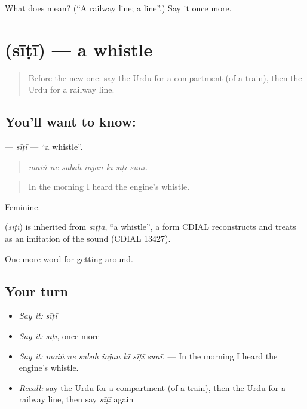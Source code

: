 \begin{tcolorbox}[breakable,colback=teal!4,colframe=teal!35!black,title={Before you move on}]
What does  mean? (\textquotedblleft{}A railway line; a line\textquotedblright{}.) Say it once more.
\end{tcolorbox}
\section[\texorpdfstring{\ur{سیٹی} (sīṭī)}{سیٹی (sīṭī)}]{ (sīṭī) — a whistle}

\label{lesson:UR-C386-siti}



\begin{quote}
Before the new one: say the Urdu for a compartment (of a train), then the Urdu for a railway line.
\end{quote}

\subsection*{You'll want to know: }
\textbf{} — \emph{sīṭī} — \textquotedblleft{}a whistle\textquotedblright{}.

\begin{quote}
      
\end{quote}

\begin{quote}
\emph{maiṅ ne subah injan kī sīṭī sunī.}
\end{quote}

\begin{quote}
In the morning I heard the engine's whistle.
\end{quote}

Feminine.

\begin{cousinweb}
\textbf{} (\emph{sīṭī}) is inherited from \emph{sīṭṭa}, \textquotedblleft{}a whistle\textquotedblright{}, a form CDIAL reconstructs and treats as an imitation of the sound (CDIAL 13427).
\end{cousinweb}

\begin{grammarlens}[title={What you've built}]
One more word for getting around.
\end{grammarlens}

\subsection*{Your turn}
\begin{itemize}
\raggedright
  \item \emph{Say it:} \emph{sīṭī}
  \item \emph{Say it:} \emph{sīṭī}, once more
  \item \emph{Say it:} \emph{maiṅ ne subah injan kī sīṭī sunī.} — In the morning I heard the engine's whistle.
  \item \emph{Recall:} say the Urdu for a compartment (of a train), then the Urdu for a railway line, then say \emph{sīṭī} again
\end{itemize}

